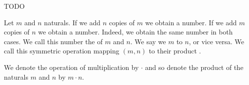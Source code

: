 
\sbasic












\sstart
{}


TODO


Let $m$ and $n$ naturals.
If we add $n$ copies of $m$ we obtain a number.
If we add $m$ copies of $n$ we obtain a number.
Indeed, we obtain the same number in both cases.
We call this number the  of $m$ and $n$.
We say we  $m$ to $n$, or vice versa.
We call this symmetric operation mapping $(m, n)$ to their product
.


We denote the operation of multiplication by
$\cdot$ and so denote the product of the naturals
$m$ and $n$ by $m \cdot n$.
\strats
